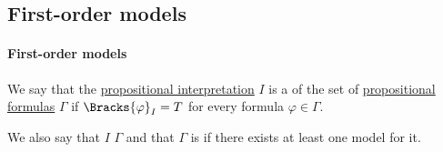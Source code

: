 \subsection{First-order models}\label{subsec:first_order_models}

\paragraph{First-order models}

\begin{definition}\label{def:propositional_model}
  We say that the \hyperref[def:propositional_valuation/interpretation]{propositional interpretation} \( I \) is a  of the set of \hyperref[def:propositional_syntax/formula]{propositional formulas} \( \Gamma \) if \( \Bracks{\varphi}_I = T \) for every formula \( \varphi \in \Gamma \).

  We also say that \( I \)  \( \Gamma \) and that \( \Gamma \) is  if there exists at least one model for it.
\end{definition}

